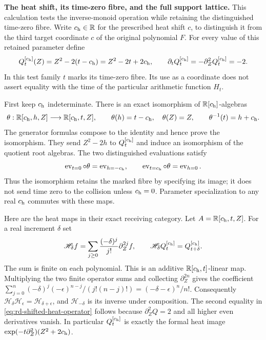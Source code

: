 \RD\textbf{The heat shift, its time-zero fibre, and the full support lattice.}
This calculation tests the inverse-monoid operation while retaining
the distinguished time-zero fibre. Write $c_{\rm h}\in\mathbb R$
for the prescribed heat shift $c$, to distinguish it from the third
target coordinate $c$ of the original polynomial $F$. For every
value of this retained parameter define
\begin{equation}
 Q_t^{[c_{\rm h}]}(Z)=Z^2-2(t-c_{\rm h})
 =Z^2-2t+2c_{\rm h},\qquad
 \partial_tQ_t^{[c_{\rm h}]}=-\partial_Z^2Q_t^{[c_{\rm h}]}=-2.
 \label{eq:rd-shifted-heat}
\end{equation}
In this test family $t$ marks its time-zero fibre. Its use as a
coordinate does not assert equality with the time of the particular
arithmetic function $H_t$.

First keep $c_{\rm h}$ indeterminate. There is an exact isomorphism
of $\mathbb R[c_{\rm h}]$-algebras
\begin{equation}
 \theta:\mathbb R[c_{\rm h},h,Z]\longrightarrow
              \mathbb R[c_{\rm h},t,Z],\qquad
 \theta(h)=t-c_{\rm h},\quad\theta(Z)=Z,
 \qquad \theta^{-1}(t)=h+c_{\rm h}.
 \label{eq:rd-shifted-coordinate-map}
\end{equation}
The generator formulas compose to the identity and hence prove the
isomorphism. They send $Z^2-2h$ to
$Q_t^{[c_{\rm h}]}$ and induce an isomorphism of the quotient root
algebras. The two distinguished evaluations satisfy
\begin{equation}
 \operatorname{ev}_{t=0}\circ\theta
   =\operatorname{ev}_{h=-c_{\rm h}},\qquad
 \operatorname{ev}_{t=c_{\rm h}}\circ\theta
   =\operatorname{ev}_{h=0}.
 \label{eq:rd-shifted-marked-fibres}
\end{equation}
Thus the isomorphism retains the marked fibre by specifying its
image; it does not send time zero to the collision unless
$c_{\rm h}=0$. Parameter specialization to any real $c_{\rm h}$
commutes with these maps.

Here are the heat maps in their exact receiving category. Let
$A=\mathbb R[c_{\rm h},t,Z]$. For a real increment $\delta$ set
\begin{equation}
 \mathscr H_\delta f
   =\sum_{j\ge0}\frac{(-\delta)^j}{j!}\partial_Z^{2j}f,
 \qquad
 \mathscr H_\delta Q_t^{[c_{\rm h}]}
   =Q_{t+\delta}^{[c_{\rm h}]}.
 \label{eq:rd-shifted-heat-operator}
\end{equation}
The sum is finite on each polynomial. This is an additive
$\mathbb R[c_{\rm h},t]$-linear map. Multiplying the two finite
operator sums and collecting $\partial_Z^{2n}$ gives the coefficient
$\sum_{j=0}^n(-\delta)^j(-\epsilon)^{n-j}/(j!(n-j)!)
=(-\delta-\epsilon)^n/n!$. Consequently
$\mathscr H_\delta\mathscr H_\epsilon
=\mathscr H_{\delta+\epsilon}$, and
$\mathscr H_{-\delta}$ is its inverse under composition.
The second equality in \eqref{eq:rd-shifted-heat-operator} follows
because $\partial_Z^2Q=2$ and all higher even derivatives vanish.
In particular $Q_t^{[c_{\rm h}]}$ is exactly the formal heat image
$\exp(-t\partial_Z^2)(Z^2+2c_{\rm h})$.

